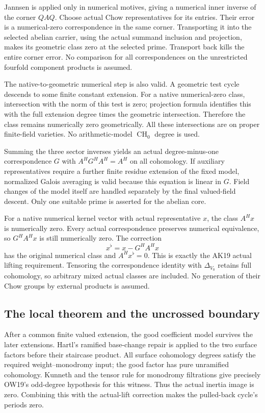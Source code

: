 Jannsen is applied only in numerical motives, giving a numerical
inner inverse of the corner $QAQ$. Choose actual Chow representatives
for its entries. Their error is a numerical-zero correspondence in
the same corner. Transporting it into the selected abelian carrier,
using the actual summand inclusion and projection, makes its
geometric class zero at the selected prime. Transport back kills
the entire corner error. No comparison for all correspondences on
the unrestricted fourfold component products is assumed.

The native-to-geometric numerical step is also valid. A geometric
test cycle descends to some finite constant extension. For a native
numerical-zero class, intersection with the norm of this test is
zero; projection formula identifies this with the full extension
degree times the geometric intersection. Therefore the class remains
numerically zero geometrically. All these intersections are on proper
finite-field varieties. No arithmetic-model $\operatorname{CH}_0$
degree is used.

Summing the three sector inverses yields an actual degree-minus-one
correspondence $G$ with $A^HG^HA^H=A^H$ on all cohomology.
If auxiliary representatives require a further finite residue
extension of the fixed model, normalized Galois averaging is valid
because this equation is linear in $G$. Field changes of the model
itself are handled separately by the final valued-field descent.
Only one suitable prime is asserted for the abelian core.

For a native numerical kernel vector with actual representative $x$,
the class $A^Hx$ is numerically zero. Every actual correspondence
preserves numerical equivalence, so $G^HA^Hx$ is still numerically
zero. The correction
\[
             x^\flat=x-G^HA^Hx
\]
has the original numerical class and $A^Hx^\flat=0$. This is exactly
the AK19 actual lifting requirement. Tensoring the correspondence
identity with $\Delta_{V_0}$ retains full cohomology, so arbitrary
mixed actual classes are included. No generation of their Chow groups
by external products is assumed.

\subsection{The local theorem and the uncrossed boundary}

After a common finite valued extension, the good coefficient model
survives the later extensions. Hartl's ramified base-change repair is
applied to the two surface factors before their staircase product.
All surface cohomology degrees satisfy the required
weight--monodromy input; the good factor has pure unramified
cohomology. Kunneth and the tensor rule for monodromy filtrations
give precisely OW19's odd-degree hypothesis for this witness.
Thus the actual inertia image is zero. Combining this with the
actual-lift correction makes the pulled-back cycle's periods zero.

